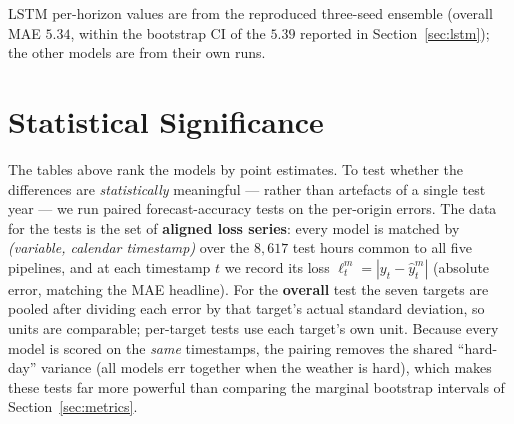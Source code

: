 \documentclass[12pt,a4paper,oneside]{report}
\begin{document}
\noindent\footnotesize LSTM per-horizon values are from the reproduced three-seed
ensemble (overall MAE $5.34$, within the bootstrap CI of the $5.39$ reported in
Section~\ref{sec:lstm}); the other models are from their own runs.\normalsize

\section{Statistical Significance}
\label{sec:significance}
The tables above rank the models by point estimates. To test whether the
differences are \emph{statistically} meaningful --- rather than artefacts of a
single test year --- we run paired forecast-accuracy tests on the per-origin
errors. The data for the tests is the set of \textbf{aligned loss series}: every
model is matched by \emph{(variable, calendar timestamp)} over the $8{,}617$ test
hours common to all five pipelines, and at each timestamp $t$ we record its loss
$\ell^m_t=|y_t-\hat y^{m}_t|$ (absolute error, matching the MAE headline). For the
\textbf{overall} test the seven targets are pooled after dividing each error by
that target's actual standard deviation, so units are comparable; per-target tests
use each target's own unit. Because every model is scored on the \emph{same}
timestamps, the pairing removes the shared ``hard-day'' variance (all models err
together when the weather is hard), which makes these tests far more powerful than
comparing the marginal bootstrap intervals of Section~\ref{sec:metrics}.
\end{document}
